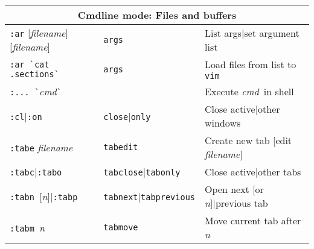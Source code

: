 \documentclass[main.tex]{subfiles}
\newcommand{\vim}{\lstinline{vim}\xspace}
\newcommand{\vmode}[1]{\colorbox{clrlightgray}{#1 mode}}
\newcommand{\vcmd}{\textit{cmd}}
\newcommand{\vfname}{\textit{filename}}
\newcommand{\vnum}{\textit{n}}
\begin{document}
\begin{longtable}{ l | l | l}
  \multicolumn{3}{c}{ \vmode{Cmdline}: Files and buffers } \\
  \hline
  \lstinline$:ar$ [\vfname] [\vfname] & \lstinline$args$ & List args|set argument list \\
  \lstinline$:ar `cat .sections`$ & \lstinline$args$ & Load files from list to \vim \\
  \lstinline$:... `$\vcmd\lstinline$`$ & & Execute \vcmd\ in shell \\
  \lstinline$:cl$|\lstinline$:on$ & \lstinline$close$|\lstinline$only$ & Close active|other windows \\
  \lstinline$:tabe$ \vfname & \lstinline$tabedit$ & Create new tab [edit \vfname] \\
  \lstinline$:tabc$|\lstinline$:tabo$ & \lstinline$tabclose$|\lstinline$tabonly$ & Close active|other tabs \\
  \lstinline$:tabn $[\vnum]|\lstinline$:tabp$ & \lstinline$tabnext$|\lstinline$tabprevious$ & Open next [or \vnum]|previous tab \\
  \lstinline$:tabm $\vnum & \lstinline$tabmove$ & Move current tab after \vnum \\
  \hline


\end{longtable}
\end{document}
